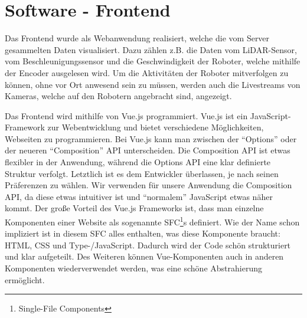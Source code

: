 
\chapter{Software - Frontend}
\label{sec:software_frontend}
Das Frontend wurde als Webanwendung realisiert,
welche die vom Server gesammelten Daten visualisiert.
%
Dazu zählen z.B. die Daten vom LiDAR-Sensor,
vom Beschleunigungssensor
und die Geschwindigkeit der Roboter,
welche mithilfe der Encoder ausgelesen wird.
%
Um die Aktivitäten der Roboter mitverfolgen zu können,
ohne vor Ort anwesend sein zu müssen,
werden auch die Livestreams von Kameras,
welche auf den Robotern angebracht sind,
angezeigt.

Das Frontend wird mithilfe von Vue.js programmiert.
%
Vue.js ist ein JavaScript-Framework zur Webentwicklung
und bietet verschiedene Möglichkeiten,
Webseiten zu programmieren.
%
Bei Vue.js kann man zwischen der ``Options'' oder
der neueren ``Composition'' API unterscheiden.
%
Die Composition API ist etwas flexibler in der Anwendung,
während die Options API eine klar definierte Struktur verfolgt.
%
Letztlich ist es dem Entwickler überlassen,
je nach seinen Präferenzen zu wählen.
%
Wir verwenden für unsere Anwendung die Composition API,
da diese etwas intuitiver ist
und ``normalem'' JavaScript etwas näher kommt. 
%
Der große Vorteil des Vue.js Frameworks ist,
dass man einzelne Komponenten einer Website
als sogenannte SFC\footnote{Single-File Components}s definiert.
%
Wie der Name schon impliziert ist in diesem SFC alles enthalten,
was diese Komponente braucht: HTML, CSS und Type-/JavaScript.
%
Dadurch wird der Code schön strukturiert und klar aufgeteilt.
%
Des Weiteren können Vue-Komponenten auch
in anderen Komponenten wiederverwendet werden,
was eine schöne Abstrahierung ermöglicht.

